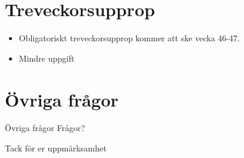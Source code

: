 \documentclass{beamer}
\begin{document}
\section{Treveckorsupprop}
\begin{frame}
  \begin{itemize}
  \item Obligatoriskt treveckorsupprop kommer att ske vecka 46-47.
  \item Mindre uppgift
  \end{itemize}

\end{frame}

\section{Övriga frågor}
\begin{frame}{Övriga frågor}
  \centering Frågor?
\end{frame}

\begin{frame}
  \centering Tack för er uppmärksamhet
\end{frame}
\end{document}
